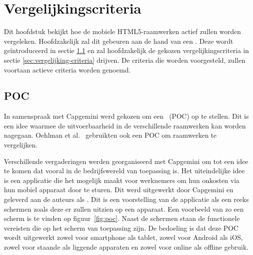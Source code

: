 \chapter{Vergelijkingscriteria}
\label{chap:vergelijkingscriteria}

Dit hoofdstuk bekijkt hoe de mobiele HTML5-raamwerken actief zullen worden vergeleken.
Hoofdzakelijk zal dit gebeuren aan de hand van een .
Deze wordt geïntroduceerd in sectie \ref{sec:vergelijking-poc} en zal hoofdzakelijk de gekozen vergelijkingscriteria in sectie \ref{sec:vergelijking-criteria} drijven.
De criteria die worden voorgesteld, zullen voortaan actieve criteria worden genoemd.


\section{POC}
\label{sec:vergelijking-poc}
In samenspraak met Capgemini werd gekozen om een ~(POC) op te stellen.
Dit is een idee waarmee de uitvoerbaarheid in de verschillende raamwerken kan worden nagegaan.
Oehlman et al.~\cite{Oeflman2011} gebruikten ook een POC om raamwerken te vergelijken.

Verschillende vergaderingen werden georganiseerd met Capgemini om tot een idee te komen dat vooral in de bedrijfswereld van toepassing is.
Het uiteindelijke idee is een applicatie die het mogelijk maakt voor werknemers om hun onkosten via hun mobiel apparaat door te sturen.
Dit werd uitgewerkt door Capgemini en geleverd aan de auteurs als .
Dit is een voorstelling van de applicatie als een reeks schermen zoals deze er zullen uitzien op een apparaat. 
Een voorbeeld van zo een scherm is te vinden op figuur~\ref{fig:poc}. 
Naast de schermen staan de functionele vereisten die op het scherm van toepassing zijn.
De bedoeling is dat deze POC wordt uitgewerkt zowel voor smartphone als tablet, zowel voor Android als iOS, zowel voor staande als liggende apparaten en zowel voor online als offline gebruik.

